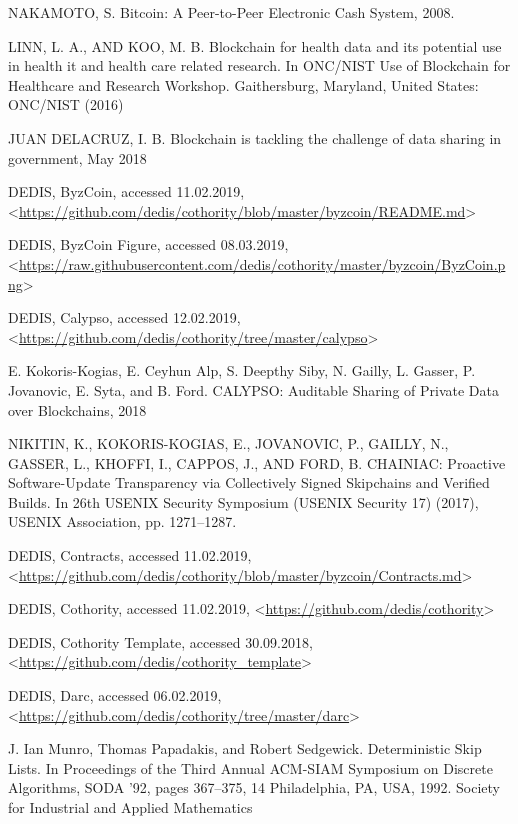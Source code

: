 \begin{thebibliography}{9}

 NAKAMOTO, S. Bitcoin: A Peer-to-Peer Electronic Cash System, 2008.

 LINN, L. A., AND KOO, M. B. Blockchain for health data and its potential use in health it and health care related research. In ONC/NIST Use of Blockchain for Healthcare and Research Workshop. Gaithersburg,
Maryland, United States: ONC/NIST (2016)

 JUAN DELACRUZ, I. B. Blockchain is tackling the challenge of data sharing in government, May 2018

 DEDIS, ByzCoin, accessed 11.02.2019, <\url{https://github.com/dedis/cothority/blob/master/byzcoin/README.md}>

 DEDIS, ByzCoin Figure, accessed 08.03.2019, <\url{https://raw.githubusercontent.com/dedis/cothority/master/byzcoin/ByzCoin.png}>

 DEDIS, Calypso, accessed 12.02.2019, <\url{https://github.com/dedis/cothority/tree/master/calypso}>

 E. Kokoris-Kogias, E. Ceyhun Alp, S. Deepthy Siby, N. Gailly, L. Gasser, P. Jovanovic, E. Syta, and B. Ford. CALYPSO: Auditable Sharing of Private Data over Blockchains, 2018

 NIKITIN, K., KOKORIS-KOGIAS, E., JOVANOVIC, P., GAILLY,
N., GASSER, L., KHOFFI, I., CAPPOS, J., AND FORD, B. CHAINIAC:
Proactive Software-Update Transparency via Collectively Signed Skipchains and Verified Builds. In 26th USENIX Security Symposium (USENIX Security 17) (2017), USENIX Association, pp. 1271–1287.

 DEDIS, Contracts, accessed 11.02.2019, <\url{https://github.com/dedis/cothority/blob/master/byzcoin/Contracts.md}>

 DEDIS, Cothority, accessed 11.02.2019, <\url{https://github.com/dedis/cothority}>

 DEDIS, Cothority Template, accessed 30.09.2018, <\url{https://github.com/dedis/cothority\_template}>

 DEDIS, Darc, accessed 06.02.2019, <\url{https://github.com/dedis/cothority/tree/master/darc}> 

 J. Ian Munro, Thomas Papadakis, and Robert Sedgewick.
Deterministic Skip Lists. In Proceedings of the Third Annual ACM-SIAM
Symposium on Discrete Algorithms, SODA ’92, pages 367–375,
14 Philadelphia, PA, USA, 1992. Society for Industrial and Applied Mathematics


\end{thebibliography}
